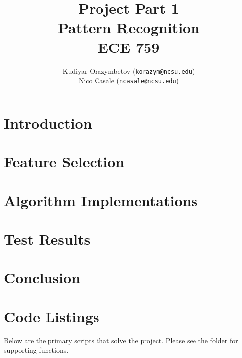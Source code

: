\documentclass[]{ncmathy}
\newcommand{\theassignment}{Project Part 1}
\newcommand{\thecourse}{Pattern Recognition\\ECE 759}
\begin{document}
\title{\theassignment\\\thecourse}
\author{Kudiyar Orazymbetov (\texttt{korazym@ncsu.edu})\\Nico Casale (\texttt{ncasale@ncsu.edu})}

\makeFancyTitle

\tableofcontents
\makeatletter
\let\@starttoc\@multitoc@starttoc
\listoffigures
\listoftables
\lstlistoflistings
\makeatother

\pagebreak

\section{Introduction} 
	

\section{Feature Selection}
	

\section{Algorithm Implementations}
	
	

\section{Test Results}
	

\section{Conclusion}
	




\section{Code Listings}

Below are the primary scripts that solve the project. Please see the
 folder for supporting functions.


\end{document}
